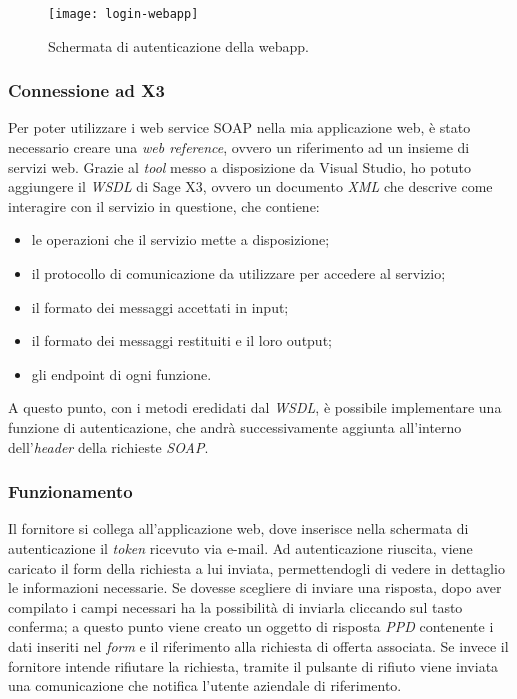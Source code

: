 \begin{figure}[htbp]
	\begin{center}
		\texttt{[image: login-webapp]}
		\caption{Schermata di autenticazione della webapp.}
	\end{center}
\end{figure}

\subsubsection{Connessione ad X3}
Per poter utilizzare i web service SOAP nella mia applicazione web, è stato necessario creare una \textit{web reference}, ovvero un riferimento ad un insieme di servizi web.
Grazie al \textit{tool} messo a disposizione da Visual Studio, ho potuto aggiungere il \textit{WSDL} di Sage X3, ovvero un documento \textit{XML} che descrive come interagire con il servizio in questione, che contiene:
\begin{itemize}
	\item le operazioni che il servizio mette a disposizione;
	\item il protocollo di comunicazione da utilizzare per accedere al servizio;
	\item il formato dei messaggi accettati in input;
	\item il formato dei messaggi restituiti e il loro output;
	\item gli endpoint di ogni funzione.
\end{itemize}
A questo punto, con i metodi eredidati dal \textit{WSDL}, è possibile implementare una funzione di autenticazione, che andrà successivamente aggiunta all'interno dell'\textit{header} della richieste \textit{SOAP}.



\subsubsection{Funzionamento}
Il fornitore si collega all'applicazione web, dove inserisce nella schermata di autenticazione il \textit{token} ricevuto via e-mail.
Ad autenticazione riuscita, viene caricato il form della richiesta a lui inviata, permettendogli di vedere in dettaglio le informazioni necessarie.
Se dovesse scegliere di inviare una risposta, dopo aver compilato i campi necessari ha la possibilità di inviarla cliccando sul tasto conferma; a questo punto viene creato un oggetto di risposta \textit{PPD} contenente i dati inseriti nel \textit{form} e il riferimento alla richiesta di offerta associata.
Se invece il fornitore intende rifiutare la richiesta, tramite il pulsante di rifiuto viene inviata una comunicazione che notifica l'utente aziendale di riferimento.

